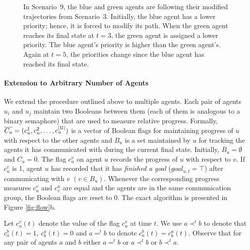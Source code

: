 \begin{eg}
\begin{figure}[htb!]
{}
\caption{ In Scenario~9, the blue and green agents are following their modified trajectories from Scenario~3. Initially, the blue agent has a lower priority; hence, it is forced to modify its path. When the green agent reaches its final state at $t=3$, the green agent is assigned a lower priority. The blue agent's priority is higher than the green agent's. Again at $t=5$, the priorities change since the blue agent has reached its final state.}
\label{fig:eg6}
\end{figure}
\end{eg}

\paragraph*{Extension to Arbitrary Number of Agents}

We extend the procedure outlined above to multiple agents. Each pair of agents $u_i$ and $u_j$ maintain two Booleans between them (each of them is analogous to a binary semaphore) that are used to measure relative progress. 
Formally, $\overline{C_u} = (c_u^1,c_u^2,\ldots ,c_u^{|\mathcal{U}|})$ is a vector of Boolean flags for maintaining progress of $u$ with respect to the other agents and $B_u$ is a set maintained by $u$ for tracking the agents it has communicated with during the current final state.
Initially, $B_u = \emptyset$ and $\overline{C_u} = \overline{0}$. The flag $c_u^v$ on agent $u$ records the progress of $u$ with respect to $v$. If $c^v_u$ is 1, agent $u$ has recorded that it has \emph{finished a goal} ($goal_{u,t} = \top$) after communicating with $v$ $(v \in B_u)$. Whenever the corresponding progress measures $c_u^v$ and $c_v^u$ are equal and the agents are in the same communication group, the Boolean flags are reset to $0$. The exact algorithm is presented in Figure \ref{fig:flow}b.

Let $c^v_u(t)$ denote the value of the flag $c^v_u$ at time $t$.
We use $a \prec^t b$ to denote that $c_a^b(t) =1,~c_b^a(t)=0$ and $a=^tb$ to denote $c_a^b(t) = c_b^a(t)$. Observe that for any pair of agents $a$ and $b$ either $a =^t b$ or $a \prec^t b$ or $b \prec^t a$. %

